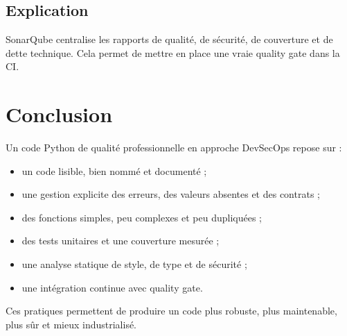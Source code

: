 \documentclass[a4paper,11pt]{report}
\begin{document}
\section{Explication}
SonarQube centralise les rapports de qualité, de sécurité, de couverture et de dette technique.
Cela permet de mettre en place une vraie quality gate dans la CI.

\chapter{Conclusion}

Un code Python de qualité professionnelle en approche DevSecOps repose sur :
\begin{itemize}
    \item un code lisible, bien nommé et documenté ;
    \item une gestion explicite des erreurs, des valeurs absentes et des contrats ;
    \item des fonctions simples, peu complexes et peu dupliquées ;
    \item des tests unitaires et une couverture mesurée ;
    \item une analyse statique de style, de type et de sécurité ;
    \item une intégration continue avec quality gate.
\end{itemize}

Ces pratiques permettent de produire un code plus robuste, plus maintenable, plus sûr et mieux industrialisé.
\end{document}
